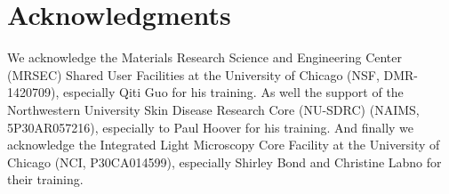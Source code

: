 \documentclass[10pt,letterpaper]{article}
\begin{document}
\section*{Acknowledgments}
We acknowledge the Materials Research Science and Engineering Center (MRSEC) Shared User Facilities at the University of Chicago (NSF, DMR-1420709), especially Qiti Guo for his training.
As well the support of the Northwestern University Skin Disease Research Core (NU-SDRC) (NAIMS, 5P30AR057216), especially to Paul Hoover for his training.
And finally we acknowledge the Integrated Light Microscopy Core Facility at the University of Chicago (NCI, P30CA014599), especially Shirley Bond and Christine Labno for their training.

%
%
% 

\nolinenumbers
\FloatBarrier



%
%
% 
\end{document}
